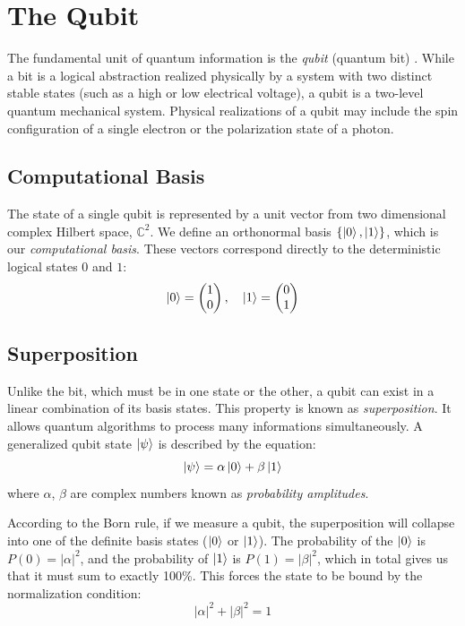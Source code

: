 \section{The Qubit}

The fundamental unit of quantum information is the \textit{qubit} (quantum bit) \cite{nielsen2010quantum}.
%
%
While a bit is a logical abstraction realized physically by a system with two distinct stable states (such as a high or low electrical voltage), 
a qubit is a two-level quantum mechanical system.
%
%
Physical realizations of a qubit may include the spin configuration of a single electron or the polarization state of a photon.
%
%
\subsection{Computational Basis}

The state of a single qubit is represented by a unit vector from two dimensional complex Hilbert space, $\mathbb{C}^2$.
%
%
We define an orthonormal basis $\{\ket{0}, \ket{1}\}$, which is our \textit{computational basis}.
These vectors correspond directly to the deterministic logical states $0$ and $1$:
\bigskip
\begin{equation}
    \ket{0} = \begin{pmatrix} 1 \\ 0 \end{pmatrix}, \quad \ket{1} = \begin{pmatrix} 0 \\ 1 \end{pmatrix}
\end{equation}
\bigskip
%
%
\subsection{Superposition}

Unlike the bit, which must be in one state or the other, a qubit can exist in a linear combination of its basis states.
%
%
This property is known as \textit{superposition}. It allows quantum algorithms to process many informations simultaneously.
A generalized qubit state $\ket{\psi}$ is described by the equation:
\bigskip
\begin{equation}
    \ket{\psi} = \alpha\ket{0} + \beta\ket{1}
\end{equation}
\bigskip
where $\alpha$, $\beta$ are complex numbers known as \textit{probability amplitudes}.
%
%

According to the Born rule, if we measure a qubit, the superposition will collapse into one of the definite basis states ($\ket{0}$ or $\ket{1}$).
%
%
The probability of the $\ket{0}$ is $P(0) = |\alpha|^2$, and the probability of $\ket{1}$ is $P(1) = |\beta|^2$, which in total gives us
that it must sum to exactly 100\%.
%
%
This forces the state to be bound by the normalization condition:
\bigskip
\begin{equation}
    |\alpha|^2 + |\beta|^2 = 1
\end{equation}
\bigskip
%
%
